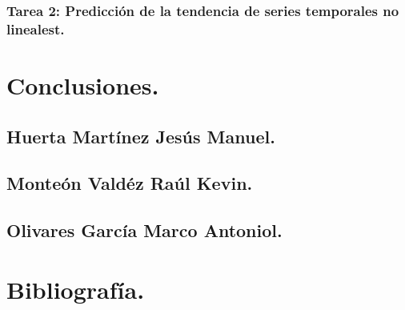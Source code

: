 \documentclass[oneside,10pt]{book}
\begin{document}
\subsection{Tarea 2: Predicción de la tendencia de series temporales no linealest.}


\chapter{Conclusiones.}

\section{Huerta Martínez Jesús Manuel.}

\section{Monteón Valdéz Raúl Kevin.}

\section{Olivares García Marco Antoniol.}


\chapter{Bibliografía.}

	
\end{document}
